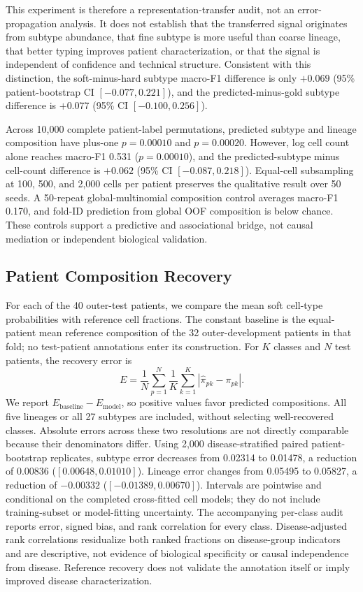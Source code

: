 \documentclass{article} %
\begin{document}
This experiment is therefore a representation-transfer audit, not an error-
propagation analysis. It does not establish that the transferred signal
originates from subtype abundance, that fine subtype is more useful than coarse
lineage, that better typing improves patient characterization, or that the
signal is independent of confidence and technical structure. Consistent with
this distinction, the soft-minus-hard subtype macro-F1 difference is only
$+0.069$ (95\% patient-bootstrap CI $[-0.077,0.221]$), and the
predicted-minus-gold subtype difference is $+0.077$ (95\% CI
$[-0.100,0.256]$).

Across 10{,}000 complete patient-label permutations, predicted subtype and
lineage composition have plus-one $p=0.00010$ and $p=0.00020$. However, log cell
count alone reaches macro-F1 0.531 ($p=0.00010$), and the predicted-subtype minus
cell-count difference is $+0.062$ (95\% CI $[-0.087,0.218]$). Equal-cell
subsampling at 100, 500, and 2{,}000 cells per patient preserves the qualitative
result over 50 seeds. A 50-repeat global-multinomial composition control averages
macro-F1 0.170, and fold-ID prediction from global OOF composition is below
chance. These controls support a predictive and associational bridge, not causal
mediation or independent biological validation.

\subsection{Patient Composition Recovery}
\label{sec:appendix:composition_recovery}
For each of the 40 outer-test patients, we compare the mean soft cell-type
probabilities with reference cell fractions. The constant baseline is the
equal-patient mean reference composition of the 32 outer-development patients
in that fold; no test-patient annotations enter its construction. For $K$
classes and $N$ test patients, the recovery error is
\[
 E=\frac{1}{N}\sum_{p=1}^{N}\frac{1}{K}\sum_{k=1}^{K}
 |\widehat{\pi}_{pk}-\pi_{pk}|.
\]
We report $E_{\mathrm{baseline}}-E_{\mathrm{model}}$, so positive values favor
predicted compositions. All five lineages or all 27 subtypes are included,
without selecting well-recovered classes. Absolute errors across these two
resolutions are not directly comparable because their denominators differ.
Using 2,000 disease-stratified paired patient-bootstrap replicates, subtype
error decreases from 0.02314 to 0.01478, a reduction of 0.00836
($[0.00648,0.01010]$). Lineage error changes from 0.05495 to 0.05827, a
reduction of $-0.00332$ ($[-0.01389,0.00670]$). Intervals are pointwise and
conditional on the completed cross-fitted cell models; they do not include
training-subset or model-fitting uncertainty. The accompanying per-class
audit reports error, signed bias, and rank correlation for every class.
Disease-adjusted rank correlations residualize both ranked fractions on
disease-group indicators and are descriptive, not evidence of biological
specificity or causal independence from disease. Reference recovery does not
validate the annotation itself or imply improved disease characterization.
\end{document}
